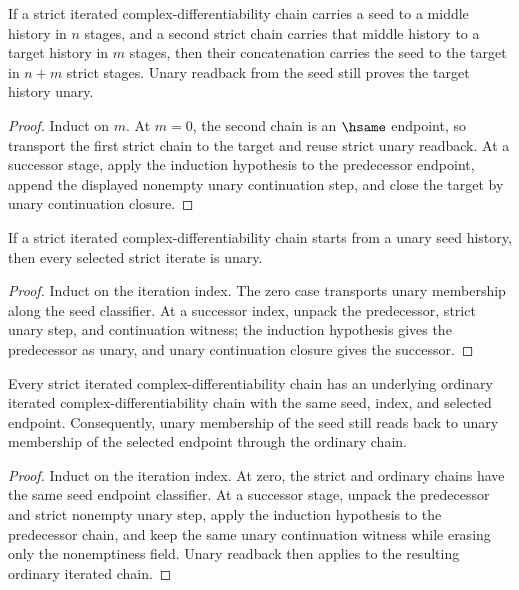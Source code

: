 \begin{theorem}
\label{thm:iterated-strict-cplx-diff-add-closed-strict-readback}
If a strict iterated complex-differentiability chain carries a seed to a middle
history in $n$ stages, and a second strict chain carries that middle history
to a target history in $m$ stages, then their concatenation carries the seed
to the target in $n+m$ strict stages. Unary readback from the seed still
proves the target history unary.
\end{theorem}
\begin{proof}
Induct on $m$. At $m=0$, the second chain is an $\hsame$ endpoint, so
transport the first strict chain to the target and reuse strict unary readback.
At a successor stage, apply the induction hypothesis to the predecessor
endpoint, append the displayed nonempty unary continuation step, and close the
target by unary continuation closure.
\end{proof}

\begin{theorem}
\label{thm:iterated-strict-cplxdiff-unary-of-seed}
If a strict iterated complex-differentiability chain starts from a unary seed
history, then every selected strict iterate is unary.
\end{theorem}
\begin{proof}
Induct on the iteration index. The zero case transports unary membership along
the seed classifier. At a successor index, unpack the predecessor, strict unary
step, and continuation witness; the induction hypothesis gives the predecessor
as unary, and unary continuation closure gives the successor.
\end{proof}

\begin{theorem}
\label{thm:iterated-strict-cplx-diff-forget-strict-unary-readback}
Every strict iterated complex-differentiability chain has an underlying
ordinary iterated complex-differentiability chain with the same seed, index,
and selected endpoint. Consequently, unary membership of the seed still reads
back to unary membership of the selected endpoint through the ordinary chain.
\end{theorem}
\begin{proof}
Induct on the iteration index. At zero, the strict and ordinary chains have
the same seed endpoint classifier. At a successor stage, unpack the predecessor
and strict nonempty unary step, apply the induction hypothesis to the
predecessor chain, and keep the same unary continuation witness while erasing
only the nonemptiness field. Unary readback then applies to the resulting
ordinary iterated chain.
\end{proof}

